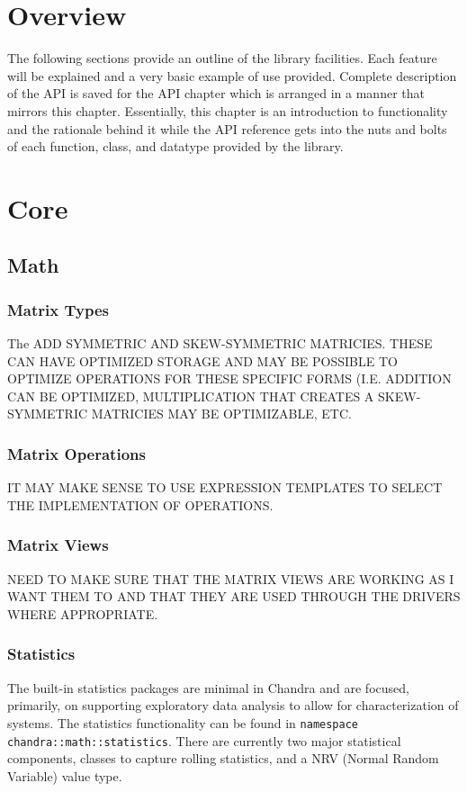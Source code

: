 \documentclass[10pt,letterpaper]{memoir} %
\begin{document}
\section{Overview}
The following sections provide an outline of the library facilities.  Each feature will be explained and a very basic example of use provided.  Complete description of the API is saved for the API chapter which is arranged in a manner that mirrors this chapter.  Essentially, this chapter is an introduction to functionality and the rationale behind it while the API reference gets into the nuts and bolts of each function, class, and datatype provided by the library.

\section{Core}
\subsection{Math}
\subsubsection{Matrix Types}
The 
ADD SYMMETRIC AND SKEW-SYMMETRIC MATRICIES.  THESE CAN HAVE OPTIMIZED STORAGE AND MAY BE POSSIBLE TO OPTIMIZE OPERATIONS FOR THESE SPECIFIC FORMS (I.E. ADDITION CAN BE OPTIMIZED, MULTIPLICATION THAT CREATES A SKEW-SYMMETRIC MATRICIES MAY BE OPTIMIZABLE, ETC.

\subsubsection{Matrix Operations}
IT MAY MAKE SENSE TO USE EXPRESSION TEMPLATES TO SELECT THE IMPLEMENTATION OF OPERATIONS.

\subsubsection{Matrix Views}
NEED TO MAKE SURE THAT THE MATRIX VIEWS ARE WORKING AS I WANT THEM TO AND THAT THEY ARE USED THROUGH THE DRIVERS WHERE APPROPRIATE.

\subsubsection{Statistics}
The built-in statistics packages are minimal in Chandra and are focused, primarily, on supporting exploratory data analysis to allow for characterization of systems.  The statistics functionality can be found in \texttt{namespace chandra::math::statistics}.  There are currently two major statistical components, classes to capture rolling statistics, and a NRV (Normal Random Variable) value type.
\end{document}
